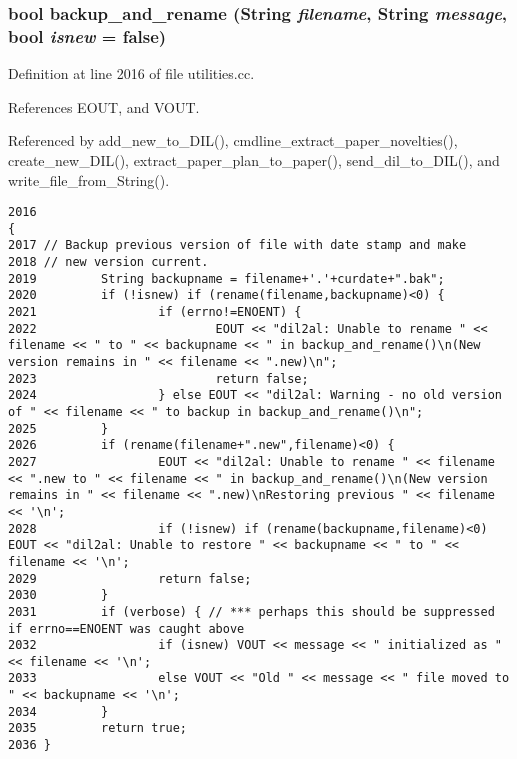 \subsubsection{\setlength{\rightskip}{0pt plus 5cm}bool backup\_\-and\_\-rename ({\bf String} {\em filename}, {\bf String} {\em message}, bool {\em isnew} = {\bf false})}\label{dil2al_8hh_a234}




Definition at line 2016 of file utilities.cc.

References EOUT, and VOUT.

Referenced by add\_\-new\_\-to\_\-DIL(), cmdline\_\-extract\_\-paper\_\-novelties(), create\_\-new\_\-DIL(), extract\_\-paper\_\-plan\_\-to\_\-paper(), send\_\-dil\_\-to\_\-DIL(), and write\_\-file\_\-from\_\-String().



\footnotesize\begin{verbatim}2016                                                                             {
2017 // Backup previous version of file with date stamp and make
2018 // new version current.
2019         String backupname = filename+'.'+curdate+".bak";
2020         if (!isnew) if (rename(filename,backupname)<0) {
2021                 if (errno!=ENOENT) {
2022                         EOUT << "dil2al: Unable to rename " << filename << " to " << backupname << " in backup_and_rename()\n(New version remains in " << filename << ".new)\n";
2023                         return false;
2024                 } else EOUT << "dil2al: Warning - no old version of " << filename << " to backup in backup_and_rename()\n";
2025         }
2026         if (rename(filename+".new",filename)<0) {
2027                 EOUT << "dil2al: Unable to rename " << filename << ".new to " << filename << " in backup_and_rename()\n(New version remains in " << filename << ".new)\nRestoring previous " << filename << '\n';
2028                 if (!isnew) if (rename(backupname,filename)<0) EOUT << "dil2al: Unable to restore " << backupname << " to " << filename << '\n';
2029                 return false;
2030         }
2031         if (verbose) { // *** perhaps this should be suppressed if errno==ENOENT was caught above
2032                 if (isnew) VOUT << message << " initialized as " << filename << '\n';
2033                 else VOUT << "Old " << message << " file moved to " << backupname << '\n';
2034         }
2035         return true;
2036 }
\end{verbatim}\normalsize 
{}
